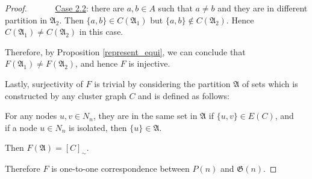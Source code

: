 \begin{proof}
	~~~~~~\underline{Case 2.2}: there are $a, b \in A$ such that $a\neq b$ and they are in different partition in $\mathfrak{A}_2$. Then $\{a,b\}\in C(\mathfrak{A}_1)$ but $\{a,b\}\notin C(\mathfrak{A}_2)$.
	Hence $C(\mathfrak{A}_1)\neq C(\mathfrak{A}_2)$ in this case.
	
	Therefore, by Proposition \ref{represent_equi}, we can conclude that $F(\mathfrak{A}_1) \neq F(\mathfrak{A}_2)$, and hence $F$ is injective.
	
	Lastly, surjectivity of $F$ is trivial by considering the partition $\mathfrak{A}$ of sets which is constructed by any cluster graph $C$ and is defined as follows:
	\begin{center}
		For any nodes $u,v\in N_n$, they are in the same set in $\mathfrak{A}$ if $\{u,v\} \in E(C)$, and\\
		if a node $u \in N_n$ is isolated, then $\{ u \} \in \mathfrak{A}$.
	\end{center}
	Then $F(\mathfrak{A}) =[C]_\sim $.
	
	Therefore $F$ is one-to-one correspondence between $P(n)$ and $\mathfrak{G}(n)$.
\end{proof}

